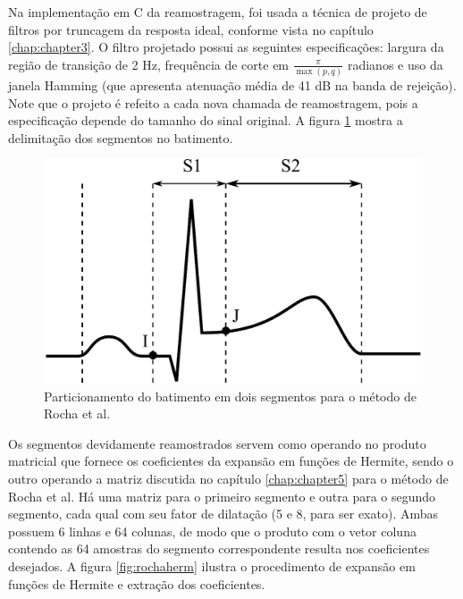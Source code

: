 Na implementação em C da reamostragem, foi usada a técnica de projeto de filtros por truncagem da resposta ideal, conforme vista no capítulo \ref{chap:chapter3}. O filtro projetado possui as seguintes especificações: largura da região de transição de 2 Hz, frequência de corte em $\frac{\pi}{\max\left(p,q\right)}$ radianos e uso da janela Hamming (que apresenta atenuação média de 41 dB na banda de rejeição). Note que o projeto é refeito a cada nova chamada de reamostragem, pois a especificação depende do tamanho do sinal original. A figura \ref{fig:rochaseg} mostra a delimitação dos segmentos no batimento.

\begin{figure}[ht]
    \centering
    \includegraphics[width=350pt]{figures/chap6-rocha-segments.pdf}
    \caption[Particionamento do batimento em dois segmentos]{Particionamento do batimento em dois segmentos para o método de Rocha et al.}
    \label{fig:rochaseg}
\end{figure}

Os segmentos devidamente reamostrados servem como operando no produto matricial que fornece os coeficientes da expansão em funções de Hermite, sendo o outro operando a matriz discutida no capítulo \ref{chap:chapter5} para o método de Rocha et al. Há uma matriz para o primeiro segmento e outra para o segundo segmento, cada qual com seu fator de dilatação (5 e 8, para ser exato). Ambas possuem 6 linhas e 64 colunas, de modo que o produto com o vetor coluna contendo as 64 amostras do segmento correspondente resulta nos coeficientes desejados. A figura \ref{fig:rochaherm} ilustra o procedimento de expansão em funções de Hermite e extração dos coeficientes.

